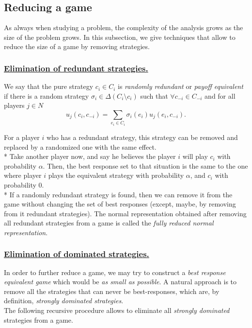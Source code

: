 \subsection{Reducing a game}
\label{chap2:sec:reduction}

As always when studying a problem, the complexity of the analysis grows as the size of the problem grows. 
In this subsection, we give techniques that allow to reduce the size of a game by removing strategies.

\subsubsection*{\underline{Elimination of redundant strategies.}}

\begin{definition}
We say that the pure strategy $c_i \in C_i$ is \emph{randomly redundant} or \emph{payoff equivalent} if there is a random strategy $\sigma_i \in \Delta(C_i \setminus c_i)$ such that $\forall c_{-i} \in C_{-i}$ and for all players $j \in N$
$$u_j(c_i, c_{-i}) = \sum_{e_i \in C_i} \sigma_i(e_i) u_j(e_i, c_{-i}).$$
\end{definition}

For a player $i$ who has a redundant strategy, this strategy can be removed and replaced by a randomized one with the same effect. \\*
Take another player now, and say he believes the player $i$ will play $c_i$ with probability $\alpha$. Then, the best response set to that situation is the same to the one where player $i$ plays the equivalent strategy with probability $\alpha$, and $c_i$ with probability 0.\\*
If a randomly redundant strategy is found, then we can remove it from the game without changing the set of best responses (except, maybe, by removing from it redundant strategies).
The normal representation obtained after removing all redundant strategies from a game is called the \emph{fully reduced normal representation}.

\subsubsection*{\underline{Elimination of dominated strategies.}} 

In order to further reduce a game, we may try to construct a \emph{best response equivalent game} which would be \emph{as small as possible}. A natural approach is to remove all the strategies that can never be best-responses, which are, by definition, \emph{strongly dominated strategies}.\\
The following recursive procedure allows to eliminate all \emph{strongly dominated} strategies from a game.
 
